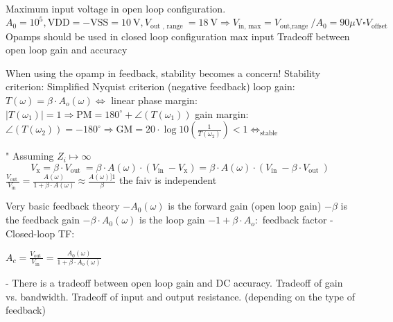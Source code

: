 \documentclass[5pt,landscape]{article}
\begin{document}
Maximum input voltage in open loop configuration.
$A_{0}=10^{5}, \mathrm{VDD}=-\mathrm{VSS}=10 \mathrm{~V}, V_{\text {out }, \text { range }}=18 \mathrm{~V} \Rightarrow V_{\text {in, } \max }=V_{\text {out,range }} / A_{0}=90 \mu \mathrm{V} \square V_{\text {offset }}$
Opamps should be used in closed loop configuration max input
Tradeoff between open loop gain and accuracy

When using the opamp in feedback, stability becomes a concern!
Stability criterion: Simplified Nyquist criterion (negative feedback) loop gain: $T(\omega)=\beta \cdot A_{o}(\omega) \Leftrightarrow$ linear
phase margin: $\left|T\left(\omega_{1}\right)\right|=1 \Rightarrow \mathrm{PM}=180^{\circ}+\angle\left(T\left(\omega_{1}\right)\right)$
gain margin: $\angle\left(T\left(\omega_{2}\right)\right)=-180^{\circ} \Rightarrow \mathrm{GM}=20 \cdot \log 10\left(\frac{1}{T\left(\omega_{2}\right)}\right)<1 \Leftrightarrow_{\text {stable }}$

" Assuming $Z_{i} \mapsto \infty$
$$
V_{\mathrm{x}}=\beta \cdot V_{\text {out }}=\beta \cdot A(\omega) \cdot\left(V_{\text {in }}-V_{\mathrm{x}}\right)=\beta \cdot A(\omega) \cdot\left(V_{\text {in }}-\beta \cdot V_{\text {out }}\right)
$$
$\frac{V_{\text {out }}}{V_{\text {in }}}=\frac{A(\omega)}{1+\beta \cdot A(\omega)} \approx \frac{A(\omega)] 1}{\beta}$ the faiv is independent

Very basic feedback theory
$-A_{0}(\omega)$ is the forward gain (open loop gain)
$-\beta$ is the feedback gain
$-\beta \cdot A_{0}(\omega)$ is the loop gain
$-1+\beta \cdot A_{o}:$ feedback factor
- Closed-loop TF:

$ A_{c}=\frac{V_{\text {out }}}{V_{\text {in }}}=\frac{A_{0}(\omega)}{1+\beta \cdot A_{o}(\omega)} $

- There is a tradeoff between open loop gain and DC accuracy.
Tradeoff of gain vs. bandwidth.
Tradeoff of input and output resistance. (depending on the type of feedback)
\end{document}
